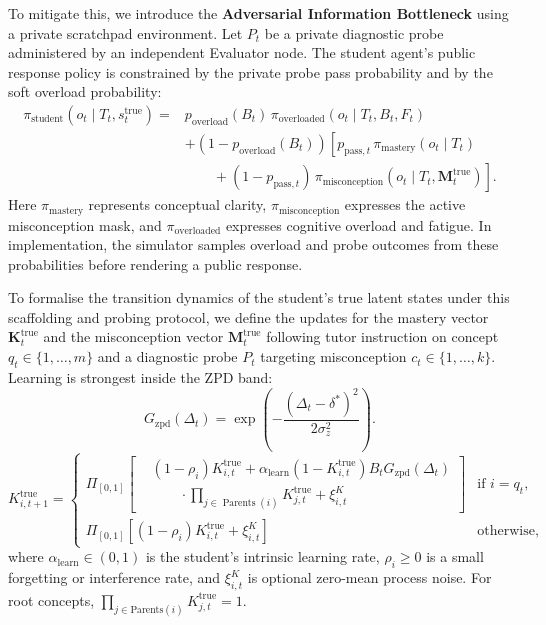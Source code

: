 \documentclass[11pt,a4paper]{report}
\begin{document}
To mitigate this, we introduce the \textbf{Adversarial Information Bottleneck} using a private scratchpad environment. Let $P_t$ be a private diagnostic probe administered by an independent Evaluator node. The student agent's public response policy is constrained by the private probe pass probability and by the soft overload probability:
\begin{equation}
\begin{aligned}
    \pi_{\text{student}}(o_t \mid T_t, s_t^{\text{true}})
    ={}& p_{\text{overload}}(B_t)\,
    \pi_{\text{overloaded}}(o_t \mid T_t,B_t,F_t)\\
    &+
    \left(1-p_{\text{overload}}(B_t)\right)
    \left[
    p_{\text{pass},t}\,\pi_{\text{mastery}}(o_t \mid T_t)\right.\\
    &\left.\qquad+
    (1-p_{\text{pass},t})\,
    \pi_{\text{misconception}}(o_t \mid T_t,\mathbf{M}_t^{\text{true}})
    \right].
\end{aligned}
\end{equation}
Here $\pi_{\text{mastery}}$ represents conceptual clarity, $\pi_{\text{misconception}}$ expresses the active misconception mask, and $\pi_{\text{overloaded}}$ expresses cognitive overload and fatigue. In implementation, the simulator samples overload and probe outcomes from these probabilities before rendering a public response.

To formalise the transition dynamics of the student's true latent states under this scaffolding and probing protocol, we define the updates for the mastery vector $\mathbf{K}_t^{\text{true}}$ and the misconception vector $\mathbf{M}_t^{\text{true}}$ following tutor instruction on concept $q_t \in \{1, \dots, m\}$ and a diagnostic probe $P_t$ targeting misconception $c_t \in \{1, \dots, k\}$. Learning is strongest inside the ZPD band:
\begin{equation}
    G_{\text{zpd}}(\Delta_t)
    =
    \exp\left(-\frac{(\Delta_t-\delta^*)^2}{2\sigma_z^2}\right).
\end{equation}
\begin{equation}
    K^{\text{true}}_{i,t+1}
    =
    \begin{cases}
    \Pi_{[0,1]}\left[
    \begin{aligned}
    &(1-\rho_i)K^{\text{true}}_{i,t}
    + \alpha_{\text{learn}}(1-K^{\text{true}}_{i,t})
      B_tG_{\text{zpd}}(\Delta_t)\\
    &\qquad {}\cdot
    \prod_{j\in\operatorname{Parents}(i)}K^{\text{true}}_{j,t}
    + \xi^K_{i,t}
    \end{aligned}
    \right] & \text{if } i=q_t,\\
    \Pi_{[0,1]}\left[(1-\rho_i)K^{\text{true}}_{i,t}+\xi^K_{i,t}\right] & \text{otherwise,}
    \end{cases}
\end{equation}
where $\alpha_{\text{learn}}\in(0,1)$ is the student's intrinsic learning rate, $\rho_i\ge0$ is a small forgetting or interference rate, and $\xi^K_{i,t}$ is optional zero-mean process noise. For root concepts, $\prod_{j\in\text{Parents}(i)}K_{j,t}^{\text{true}}=1$.
\end{document}

